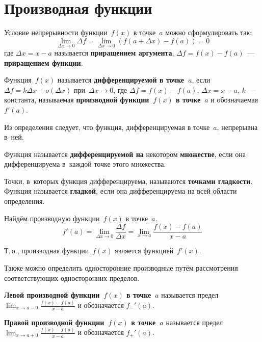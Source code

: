 \section{Производная функции}
Условие непрерывности функции~$f(x)$ в точке~$a$ можно сформулировать так:
\begin{equation*}
\lim_{\Delta x \to 0} \Delta f = \lim_{\Delta x \to 0} (f(a + \Delta x) - f(a)) = 0
\end{equation*}
где $\Delta x = x - a$ называется \textbf{приращением аргумента}, $\Delta f = f(x) - f(a)$~--- \textbf{приращением функции}.

 Функция~$f(x)$ называется \textbf{дифференцируемой в точке~$a$}, если
$\Delta f = k \Delta x + o(\Delta x)$ при~$\Delta x \to 0$, где
$\Delta f = f(x) - f(a)$,
$\Delta x = x - a$,
$k$~--- константа, называемая \textbf{производной функции~$f(x)$ в точке~$a$} и обозначаемая $f'(a)$.

Из определения следует, что функция, дифференцируемая в точке~$a$, непрерывна в~ней.

Функция называется \textbf{дифференцируемой на} некотором \textbf{множестве}, если она дифференцируема в~каждой точке этого множества.

 Точки, в~которых функция дифференцируема, называются \textbf{точками гладкости}.
Функция называется \textbf{гладкой}, если она дифференцируема на всей области определения.

Найдём производную функции~$f(x)$ в точке~$a$.
\begin{equation*}
f'(a) = \lim_{\Delta x \to 0} \frac{\Delta f}{\Delta x} = \lim_{x \to a} \frac{f(x) - f(a)}{x - a}
\end{equation*}

Т.\,о., производная функции~$f(x)$ является функцией~$f'(x)$.

Также можно определить односторонние производные путём рассмотрения соответствующих односторонних пределов.

\textbf{Левой производной функции~$f(x)$ в точке~$a$} называется предел~$\displaystyle \lim_{x \to a-0} \frac{f(x) - f(a)}{x - a}$ и обозначается $f_-'(a)$.

\textbf{Правой производной функции~$f(x)$ в точке~$a$} называется предел~$\displaystyle \lim_{x \to a+0} \frac{f(x) - f(a)}{x - a}$ и обозначается $f_+'(a)$.